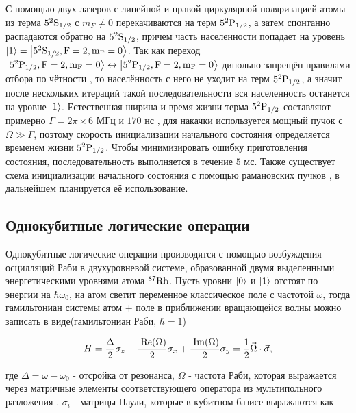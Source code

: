 С помощью двух лазеров с линейной и правой циркулярной поляризацией атомы из терма $5^2\rm{S}_{1/2}$ с $m_F\neq0$ перекачиваются на терм $5^2\rm{P}_{1/2}$, а затем спонтанно распадаются обратно на $5^2\rm{S}_{1/2}$, причем часть населенности попадает на уровень $\left| 1 \right\rangle=\left| 5^2\rm{S}_{1/2},F=2,m_F=0 \right\rangle$. Так как переход $\left| 5^2\rm{P}_{1/2},F=2,m_F=0 \right\rangle\leftrightarrow \left| 5^2\rm{P}_{1/2},F=2,m_F=0 \right\rangle$ дипольно-запрещён правилами отбора по чётности \cite{Belousov}, то населённость с него не уходит на терм $5^2\rm{P}_{1/2}$, а значит после нескольких итераций такой последовательности вся населенность останется на уровне $\left| 1 \right\rangle$. Естественная ширина и время жизни терма $5^2\rm{P}_{1/2}$ составляют примерно $\Gamma = 2\pi \times 6 \text{ МГц}$ и $170 \text{ нс}$ \cite{Rb87}, для накачки используется мощный пучок с $\Omega \gg \Gamma$, поэтому скорость инициализации начального состояния определяется временем жизни $5^2\rm{P}_{1/2}$. Чтобы минимизировать ошибку приготовления состояния, последовательность выполняется в течение $5 \text{ мс}$. Также существует схема инициализации начального состояния с помощью рамановских пучков \cite{toffoli}, в дальнейшем планируется её использование. 


\subsection{Однокубитные логические операции}

Однокубитные логические операции производятся с помощью возбуждения осцилляций Раби в двухуровневой системе, образованной двумя выделенными энергетическими уровнями атома $^{87}\rm{Rb}$. Пусть уровни $\left| 0 \right\rangle$ и $\left| 1 \right\rangle$ отстоят по энергии на $\hbar \omega_0$, на атом светит переменное классическое поле с частотой $\omega$, тогда гамильтониан системы атом + поле в приближении вращающейся волны можно записать в виде(гамильтониан Раби, $\hbar=1$) \cite{Lukin, Steck}

\begin{equation}
	H = \frac{\Delta}{2} \sigma_z + \frac{\;\rm{Re}(\Omega)}{2}\sigma_x + \frac{\;\rm{Im}(\Omega)}{2}\sigma_y= \frac{1}{2}\vec{\Omega}\cdot\vec{\sigma},
\end{equation}

где $\Delta = \omega - \omega_0$ - отсройка от резонанса, $\Omega$ - частота Раби, которая выражается через матричные элементы соответствующего оператора из мультипольного разложения \cite{LL_teorpol,Steck}. $\sigma_i$ - матрицы Паули, которые в кубитном базисе выражаются как

